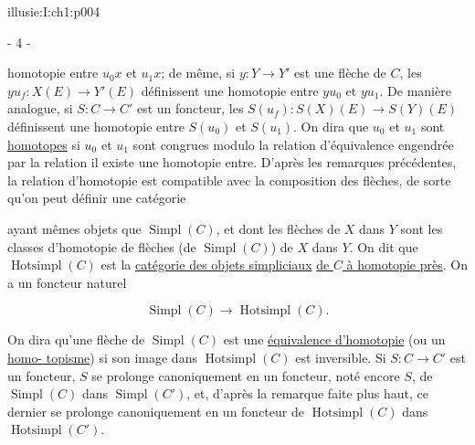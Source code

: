 \IllusieSetPhysicalPageSize{447bp}{698.6bp}
\begin{illusiebodypage}{illusie:I:ch1:p004}
\begin{center}- 4 -\end{center}
\vspace{7bp}\fontsize{9}{18}\selectfont

\hypertarget{illusie:I:ch1:s1:1:p9c1}{}%
\noindent homotopie entre $u_0x$ et $u_1x$; de même, si
$y:Y\longrightarrow Y'$ est une flèche de $C$, les
$yu_f:X(E)\longrightarrow Y'(E)$ définissent une homotopie entre $yu_0$ et
$yu_1$. De manière analogue, si $S:C\longrightarrow C'$ est un foncteur, les
$S(u_f):S(X)(E)\longrightarrow S(Y)(E)$ définissent une homotopie entre
$S(u_0)$ et $S(u_1)$. On dira que $u_0$ et $u_1$ sont
\underline{homotopes} si $u_0$ et $u_1$ sont congrues modulo la relation
d'équivalence engendrée par la relation \textquotedbl il existe une homotopie
entre\textquotedbl. D'après les remarques précédentes, la relation d'homotopie
est compatible avec la composition des flèches, de sorte qu'on peut définir
une catégorie

\hypertarget{illusie:I:ch1:s1:1:eq5}{}%
\noindent{}\par

\hypertarget{illusie:I:ch1:s1:1:p10}{}%
ayant mêmes objets que $\operatorname{Simpl}(C)$, et dont les flèches de $X$
dans $Y$ sont les classes d'homotopie de flèches (de
$\operatorname{Simpl}(C)$) de $X$ dans $Y$. On dit que
$\operatorname{Hotsimpl}(C)$ est la
\underline{catégorie des objets simpliciaux} \underline{de $C$ à homotopie
près}. On a un
foncteur naturel

\hypertarget{illusie:I:ch1:s1:1:d7}{}%
\[
  \operatorname{Simpl}(C)\longrightarrow\operatorname{Hotsimpl}(C).
\]

\hypertarget{illusie:I:ch1:s1:1:p11}{}%
On dira qu'une flèche de $\operatorname{Simpl}(C)$ est une
\underline{équivalence d'homotopie} (ou un \underline{homo-\linebreak
topisme}) si son image dans $\operatorname{Hotsimpl}(C)$ est inversible. Si
$S:C\longrightarrow C'$ est un foncteur, $S$ se prolonge canoniquement en un
foncteur, noté encore $S$, de $\operatorname{Simpl}(C)$ dans
$\operatorname{Simpl}(C')$, et, d'après la remarque faite plus haut, ce dernier
se prolonge canoniquement en un foncteur de $\operatorname{Hotsimpl}(C)$ dans
$\operatorname{Hotsimpl}(C')$.


\end{illusiebodypage}
